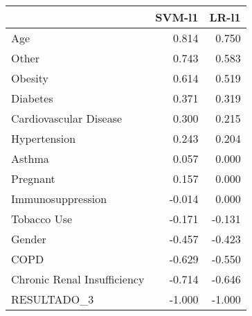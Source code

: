 \begin{tabular}{lrr}
\toprule
{} &  SVM-l1 &  LR-l1 \\
\midrule
Age                         &   0.814 &  0.750 \\
Other                       &   0.743 &  0.583 \\
Obesity                     &   0.614 &  0.519 \\
Diabetes                    &   0.371 &  0.319 \\
Cardiovascular Disease      &   0.300 &  0.215 \\
Hypertension                &   0.243 &  0.204 \\
Asthma                      &   0.057 &  0.000 \\
Pregnant                    &   0.157 &  0.000 \\
Immunosuppression           &  -0.014 &  0.000 \\
Tobacco Use                 &  -0.171 & -0.131 \\
Gender                      &  -0.457 & -0.423 \\
COPD                        &  -0.629 & -0.550 \\
Chronic Renal Insufficiency &  -0.714 & -0.646 \\
RESULTADO\_3                 &  -1.000 & -1.000 \\
\bottomrule
\end{tabular}

